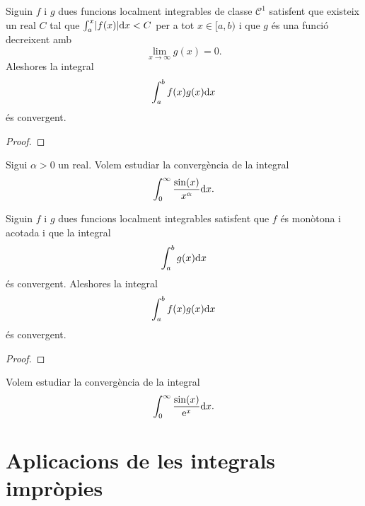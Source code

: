 \documentclass[../Apunts.tex]{subfiles}
\begin{document}
	\begin{theorem}
		\label{thm:criteri de Dirichlet per integrals impròpies}
		Siguin \(f\) i \(g\) dues funcions localment integrables de classe \(\mathcal{C}^{1}\) satisfent que existeix un real \(C\) tal que \(\int_{a}^{x}\abs{f(x)}\diff x<C\) per a tot \(x\in[a,b)\) i que \(g\) és una funció decreixent amb
		\[\lim_{x\to\infty}g(x)=0.\]
		Aleshores la integral
		\[\int_{a}^{b}f(x)g(x)\mathrm{d} x\]
		és convergent.
		\begin{proof}
		\end{proof}
	\end{theorem}
	\begin{example}
		Sigui \(\alpha>0\) un real. Volem estudiar la convergència de la integral
		\[\int_{0}^{\infty}\frac{\sin(x)}{x^{\alpha}}\mathrm{d} x.\]
		\begin{solution}
		\end{solution}
	\end{example}
	\begin{theorem}
		\label{thm:criteri d'Abel per integrals impròpies}
		Siguin \(f\) i \(g\) dues funcions localment integrables satisfent que \(f\) és monòtona i acotada i que la integral
		\[\int_{a}^{b}g(x)\mathrm{d} x\]
		és convergent. Aleshores la integral
		\[\int_{a}^{b}f(x)g(x)\mathrm{d} x\]
		és convergent.
		\begin{proof}
		\end{proof}
	\end{theorem}
	\begin{example}
		\label{ex:criteri d'Abel per integrals impròpies}
		Volem estudiar la convergència de la integral
		\[\int_{0}^{\infty}\frac{\sin(x)}{\mathrm{e}^{x}}\mathrm{d} x.\]
		\begin{solution}
		\end{solution}
	\end{example}
\section{Aplicacions de les integrals impròpies}
\end{document}
